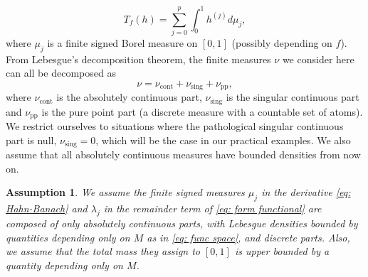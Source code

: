 \documentclass[preprint]{imsart}
\newtheorem{assumption}{Assumption}
\numberwithin{equation}{section}
\begin{document}
\begin{equation}\label{eq: Hahn-Banach}
    T_f(h)=\sum_{j=0}^p \int_0^1 h^{(j)} d\mu_j,
\end{equation} where $\mu_j$ is a finite signed Borel measure on $[0,1]$ (possibly depending on $f$). From Lebesgue's decomposition theorem, the finite measures $\nu$ we consider here can all be decomposed as
\[\nu = \nu_{\text{cont}}+\nu_{\text{sing}}+\nu_{\text{pp}},\]
where $\nu_{\text{cont}}$ is the absolutely continuous part, $\nu_{\text{sing}}$ is the singular continuous part and $\nu_{\text{pp}}$ is the pure point part (a discrete measure with a countable set of atoms). We restrict ourselves to situations where the pathological singular continuous part is null, $\nu_{\text{sing}}=0$, which will be the case in our practical examples. We also assume that all absolutely continuous measures have bounded densities from now on.

\begin{assumption}\label{assum: no singular continuous part}
    We assume the finite signed measures $\mu_j$ in the derivative \eqref{eq: Hahn-Banach} and $\lambda_j$ in the remainder term of \eqref{eq: form functional} are composed of only absolutely continuous parts, with Lebesgue densities bounded by quantities depending only on $M$ as in \eqref{eq: func space}, and discrete parts. Also, we assume that the total mass they assign to $[0,1]$ is upper bounded by a quantity depending only on $M$.
\end{assumption}
\end{document}
